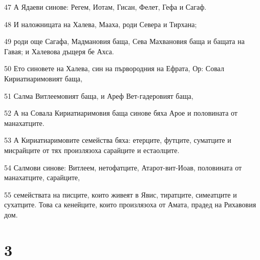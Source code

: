 \par 47 А Ядаеви синове: Регем, Иотам, Гисан, Фелет, Гефа и Сагаф.
\par 48 И наложницата на Халева, Мааха, роди Севера и Тирхана;
\par 49 роди още Сагафа, Мадмановия баща, Сева Махвановия баща и бащата на Гавая; и Халевова дъщеря бе Ахса.
\par 50 Ето синовете на Халева, син на първородния на Ефрата, Ор: Совал Кириатиаримовият баща,
\par 51 Салма Витлеемовият баща, и Ареф Вет-гадеровият баща,
\par 52 А на Совала Кириатиаримовия баща синове бяха Арое и половината от манахатците.
\par 53 А Кириатиаримовите семейства бяха: етерците, футците, суматците и мисрайците от тях произлязоха сарайците и естаолците.
\par 54 Салмови синове: Витлеем, нетофатците, Атарот-вит-Иоав, половината от манахатците, сарайците,
\par 55 семействата на писците, които живеят в Явис, тиратците, симеатците и сухатците. Това са кенейците, които произлязоха от Амата, прадед на Рихавовия дом.

\chapter{3}

